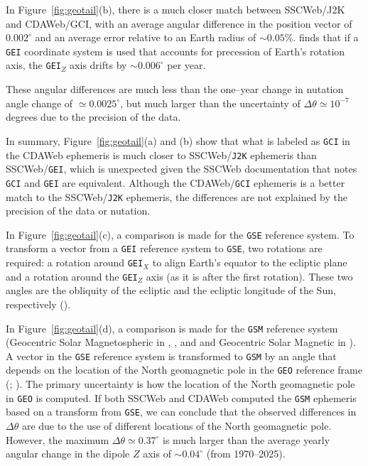 \documentclass[draft]{agujournal2019}
\begin{document}
In Figure~\ref{fig:geotail}(b), there is a much closer match between SSCWeb/J2K and CDAWeb/GCI, with an average angular difference in the position vector of ~$0.002^\circ$ and an average error relative to an Earth radius of $\sim 0.05$\%. 
 finds that if a \texttt{GEI} coordinate system is used that accounts for precession of Earth's rotation axis, the \texttt{GEI}$_Z$ axis drifts by $\sim 0.006^\circ$ per year.

These angular differences are much less than the one--year change in nutation angle change of $\simeq 0.0025^\circ$, but much larger than the uncertainty of $\Delta \theta \simeq 10^{-7}$ degrees due to the precision of the data.

In summary, Figure~\ref{fig:geotail}(a) and (b) show that what is labeled as \texttt{GCI} in the CDAWeb ephemeris is much closer to SSCWeb/\texttt{J2K} ephemeris than SSCWeb/\texttt{GEI}, which is unexpected given the SSCWeb documentation that notes \texttt{GCI} and \texttt{GEI} are equivalent. Although the CDAWeb/\texttt{GCI} ephemeris is a better match to the SSCWeb/\texttt{J2K} ephemeris, the differences are not explained by the precision of the data or nutation.

In Figure~\ref{fig:geotail}(c), a comparison is made for the \texttt{GSE} reference system. To transform a vector from a \texttt{GEI} reference system to \texttt{GSE}, two rotations are required: a rotation around \texttt{GEI}$_X$ to align Earth's equator to the ecliptic plane and a rotation around the \texttt{GEI}$_Z$ axis (as it is after the first rotation). These two angles are the obliquity of the ecliptic and the ecliptic longitude of the Sun, respectively ().

In Figure~\ref{fig:geotail}(d), a comparison is made for the \texttt{GSM} reference system (Geocentric Solar Magnetospheric in , , and  and Geocentric Solar Magnetic in ). A vector in the \texttt{GSE} reference system is transformed to \texttt{GSM} by an angle that depends on the location of the North geomagnetic pole in the \texttt{GEO} reference frame (; ). The primary uncertainty is how the location of the North geomagnetic pole in \texttt{GEO} is computed. If both SSCWeb and CDAWeb computed the \texttt{GSM} ephemeris based on a transform from \texttt{GSE}, we can conclude that the observed differences in $\Delta \theta$ are due to the use of different locations of the North geomagnetic pole. However, the maximum $\Delta \theta \simeq 0.37^\circ$ is much larger than the average yearly angular change in the dipole $Z$ axis of $\sim 0.04^\circ$ (from 1970--2025).
\end{document}
